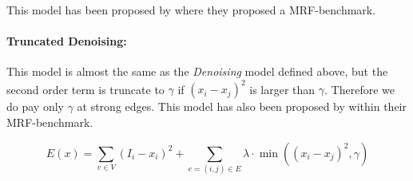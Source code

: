 This model has been proposed by \citep{szeliski_2008_pami} where they proposed a MRF-benchmark.


\paragraph{Truncated Denoising:} 

This model is almost the same as the \emph{Denoising} model defined above,
but the second order term is truncate to $\gamma$ if $(x_i-x_j)^2$ is larger than $\gamma$.
Therefore we do pay only $\gamma$ at strong edges.
This model has also been proposed by \citep{szeliski_2008_pami} within their MRF-benchmark.


\begin{equation} \label{eq:gm_ef_dension_truncated}
E(x) = \sum_{v \in V}  (I_i - x_i)^2 + \sum_{e=(i,j) \in E } \lambda \cdot \min\left( (x_i-x_j)^2, \gamma\right)
\end{equation}

